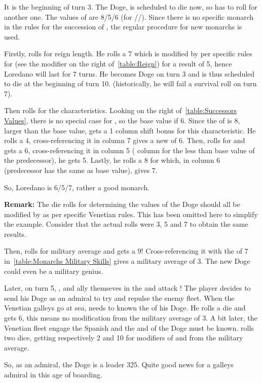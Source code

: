 \begin{exemple}
  It is the beginning of turn 3. The Doge, \monarqueBarbarigo is
  scheduled to die now, so \VEN has to roll for another one. The values
  of \monarqueBarbarigo are 8/5/6 (for \ADM/\DIP/\MIL). Since there is
  no specific monarch in the rules for the succession of
  \monarqueBarbarigo, the regular procedure for new monarchs is used.

  Firstly, \VEN rolls for reign length. He rolls a 7 which is modified
  by  per specific rules for \VEN (see the modifier on the
  right of~\ref{table:Reign}) for a result of 5, hence Loredano will
  last for 7 turns. He becomes Doge on turn 3 and is thus scheduled to
  die at the beginning of turn 10. (historically, he will fail a
  survival roll on turn 7).

  Then \VEN rolls for the characteristics. Looking on the right
  of~\ref{table:Successors Values}, there is no special case for \VEN,
  so the base value if 6. Since the \ADM of \monarqueBarbarigo is 8,
  larger than the base value, \VEN gets a 1 column shift bonus for this
  characteristic. He rolls a 4, cross-referencing it in column 7 gives a
  new \ADM of 6. Then, \VEN rolls for \DIP and gets a 6,
  cross-referencing it in column 5 ( column for the less than
  base value of the predecessor), he gets 5. Lastly, he rolls a 8 for
  \MIL which, in column 6 (predecessor has the same as base value),
  gives 7.

  So, Loredano is 6/5/7, rather a good monarch.

  \textbf{Remark:} The die rolls for determining the values of the Doge
  should all be modified by  as per specific Venetian
  rules. This has been omitted here to simplify the example. Consider
  that the actual rolls were 3, 5 and 7 to obtain the same results.

  Then, \VEN rolls for military average and gets a 9! Cross-referencing
  it with the \MIL of 7 in~\ref{table:Monarchs Military Skills} gives a
  military average of 3. The new Doge could even be a military genius.

  Later, on turn 5, \HIS, \FRA and \paysPapaute ally themseves in the
   and attack \VEN! The player decides to send
  his Doge as an admiral to try and repulse the enemy fleet. When the
  Venetian galleys go at sea, \VEN needs to known the 
  of his Doge. He rolls a die and gets 6, this means no modification
  from the military average of 3. A bit later, the Venetian fleet engage
  the Spanish and the  and  of the Doge must be
  known. \VEN rolls two dice, getting respectively 2 and 10 for
  modifiers of  and  from the military average.

  So, as an admiral, the Doge is a leader 325. Quite good news for a
  galleys admiral in this age of boarding.
\end{exemple}

